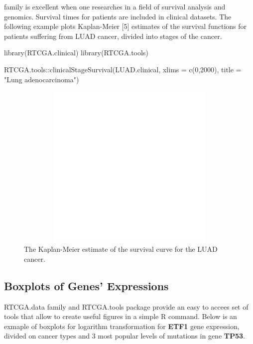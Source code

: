  family is excellent when one researches in a field of
survival analysis and genomics. Survival times for patients are included
in clinical datasets. The following example plots Kaplan-Meier {[}5{]}
estimates of the survival functions for patients suffering from LUAD
cancer, divided into stages of the cancer.

\begin{Schunk}
\begin{Sinput}
library(RTCGA.clinical)
library(RTCGA.tools)

RTCGA.tools::clinicalStageSurvival(LUAD.clinical, xlims = c(0,2000),
                                   title = "Lung adenocarcinoma")
\end{Sinput}
\end{Schunk}

\begin{figure}[h!]
\begin{centering}
\includegraphics[width=12cm, height=8cm]{km_plot_luad.pdf}
\caption{\label{km_plot}The Kaplan-Meier estimate of the survival curve for the LUAD cancer. }
\end{centering}
\end{figure}

\newpage

\subsection{Boxplots of Genes'
Expressions}\label{boxplots-of-genes-expressions}

RTCGA.data family and RTCGA.tools package provide an easy to accees set
of tools that allow to create useful figures in a simple R command.
Below is an exmaple of boxplots for logarithm transformation for
\textbf{ETF1} gene expression, divided on cancer types and 3 most
popular levels of mutations in gene \textbf{TP53}.

